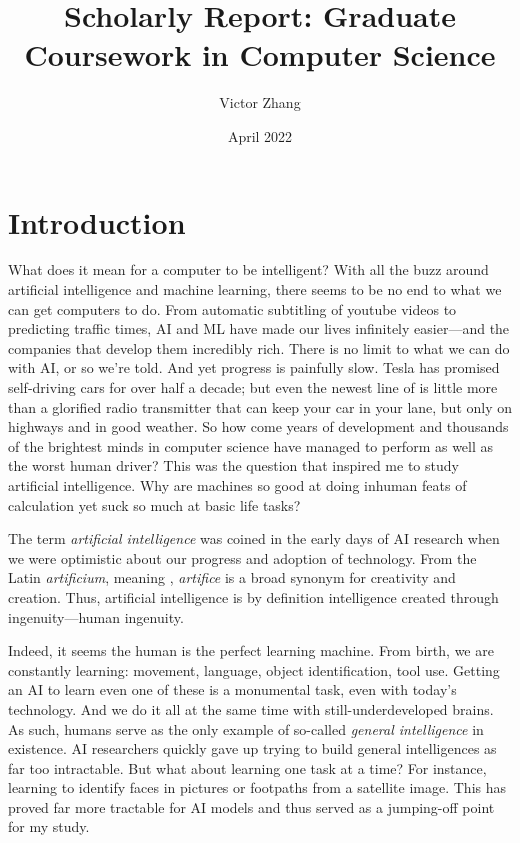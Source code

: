 \documentclass[12pt, titlepage]{article}
\title{Scholarly Report: Graduate Coursework in Computer Science}
\author{Victor Zhang}
\date{April 2022}
\begin{document}
\maketitle
\tableofcontents
\newpage

\section{Introduction}
What does it mean for a computer to be intelligent? With all the buzz around artificial intelligence and machine learning, there seems to be no end to what we can get computers to do. From automatic subtitling of youtube videos to predicting traffic times, AI and ML have made our lives infinitely easier---and the companies that develop them incredibly rich. There is no limit to what we can do with AI, or so we're told. And yet progress is painfully slow. Tesla has promised self-driving cars for over half a decade; but even the newest line of  is little more than a glorified radio transmitter that can keep your car in your lane, but only on highways and in good weather. So how come years of development and thousands of the brightest minds in computer science have managed to perform as well as the worst human driver? This was the question that inspired me to study artificial intelligence. Why are machines so good at doing inhuman feats of calculation yet suck so much at basic life tasks?

The term \textit{artificial intelligence} was coined in the early days of AI research when we were optimistic about our progress and adoption of technology. From the Latin \textit{artificium}, meaning , \textit{artifice} is a broad synonym for creativity and creation. Thus, artificial intelligence is by definition intelligence created through ingenuity---human ingenuity.

Indeed, it seems the human is the perfect learning machine. From birth, we are constantly learning: movement, language, object identification, tool use. Getting an AI to learn even one of these is a monumental task, even with today's technology. And we do it all at the same time with still-underdeveloped brains. As such, humans serve as the only example of so-called \textit{general intelligence} in existence. AI researchers quickly gave up trying to build general intelligences as far too intractable. But what about learning one task at a time? For instance, learning to identify faces in pictures or footpaths from a satellite image. This has proved far more tractable for AI models and thus served as a jumping-off point for my study.
\end{document}
